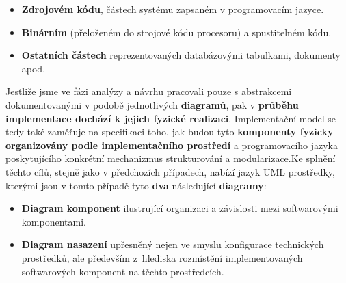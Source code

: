 \begin{itemize}
\item \textbf{Zdrojovém kódu}, částech systému zapsaném v programovacím jazyce.
\item \textbf{Binárním} (přeloženém do strojové kódu procesoru) a spustitelném kódu.
\item \textbf{Ostatních částech} reprezentovaných databázovými tabulkami, dokumenty apod.
\end{itemize}

Jestliže jsme ve fázi analýzy a návrhu pracovali pouze s abstrakcemi dokumentovanými v podobě jednotlivých \textbf{diagramů}, pak v \textbf{průběhu implementace dochází k jejich fyzické realizaci}. Implementační model se tedy také zaměřuje na specifikaci toho, jak budou tyto \textbf{komponenty fyzicky organizovány podle implementačního prostředí} a programovacího jazyka poskytujícího konkrétní mechanizmus strukturování a modularizace.Ke splnění těchto cílů, stejně jako v předchozích případech, nabízí jazyk UML prostředky, kterými jsou v tomto případě tyto \textbf{dva} následující \textbf{diagramy}:
\begin{itemize}
\item \textbf{Diagram komponent} ilustrující organizaci a závislosti mezi softwarovými komponentami.
\item \textbf{Diagram nasazení} upřesněný nejen ve smyslu konfigurace technických prostředků, ale především z hlediska rozmístění implementovaných softwarových komponent na těchto prostředcích.
\end{itemize}
